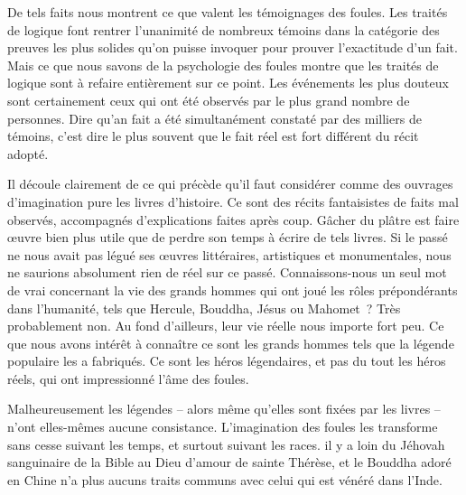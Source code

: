 \documentclass[french,twoside]{book} %
\begin{document}
De tels faits nous montrent ce que valent les témoignages des foules. Les traités de logique font rentrer l’unanimité de nombreux témoins dans la catégorie des preu­ves les plus solides qu’on puisse invoquer pour prouver l’exactitude d’un fait. Mais ce que nous savons de la psychologie des foules montre que les traités de logique sont à refaire entièrement sur ce point. Les événements les plus douteux sont certainement ceux qui ont été observés par le plus grand nombre de personnes. Dire qu’an fait a été simultanément constaté par des milliers de témoins, c’est dire le plus souvent que le fait réel est fort différent du récit adopté.\par
Il découle clairement de ce qui précède qu’il faut considérer comme des ouvrages d’imagination pure les livres d’histoire. Ce sont des récits fantaisistes de faits mal observés, accompagnés d’explications faites après coup. Gâcher du plâtre est faire œuvre bien plus utile que de perdre son temps à écrire de tels livres. Si le passé ne nous avait pas légué ses œuvres littéraires, artistiques et monumentales, nous ne saurions absolument rien de réel sur ce passé. Connaissons-nous un seul mot de vrai concernant la vie des grands hommes qui ont joué les rôles prépondérants dans l’hu­manité, tels que Hercule, Bouddha, Jésus ou Mahomet ? Très probablement non. Au fond d’ailleurs, leur vie réelle nous importe fort peu. Ce que nous avons intérêt à con­naître ce sont les grands hommes tels que la légende populaire les a fabriqués. Ce sont les héros légendaires, et pas du tout les héros réels, qui ont impressionné l’âme des foules.\par
Malheureusement les légendes – alors même qu’elles sont fixées par les livres – n’ont elles-mêmes aucune consistance. L’imagination des foules les transforme sans cesse suivant les temps, et surtout suivant les races. il y a loin du Jéhovah sanguinaire de la Bible au Dieu d’amour de sainte Thérèse, et le Bouddha adoré en Chine n’a plus aucuns traits communs avec celui qui est vénéré dans l’Inde.\par
\end{document}
